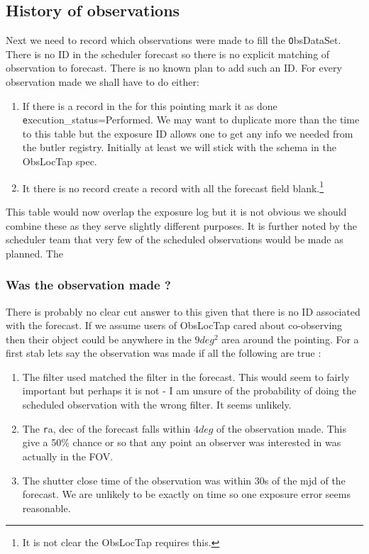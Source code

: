 \subsection{History of observations}
Next we need to record which observations were made to fill the {\texttt ObsDataSet}.
There is no ID in the scheduler forecast so there is no explicit matching of observation to forecast.
There is no known plan to add such an ID.
For every observation made we shall have to do either:
\begin{enumerate}
\item If there is a record in the \DB for this pointing mark it as done {\texttt execution\_status=Performed}.  We may want to duplicate more than the time to this table but the exposure ID allows one to get any info we needed from the butler registry.
Initially at least we will stick with the schema in the ObsLocTap spec.
\item It there is no record create a record with  all the forecast field blank.\footnote{It is not clear the ObsLocTap requires this.}
\end{enumerate}

This table would now overlap the exposure log but it is not obvious we should combine these as they serve slightly different purposes.
It is further noted by the scheduler team that very few of the scheduled observations would be made as planned. The

\subsubsection{Was the  observation made ?}\label{sec:made}
There is probably no clear cut answer to this given that there is no ID associated with the forecast.
If we assume users of ObsLocTap cared about co-observing then their object could be anywhere in the
$9 deg^2$ area around the pointing.
For a first stab lets say the observation was made if all the following are true :

\begin{enumerate}
\item The filter used matched the filter in the forecast.
This would seem to fairly important but perhaps it is not - I am unsure of the probability of
doing the scheduled observation with the wrong filter. It seems unlikely.
\item The {\texttt ra, dec} of the forecast falls within $4 deg$ of the observation made.
This give a 50\% chance or so that any point an observer was interested in was actually in the FOV.
\item The shutter close time of the observation was within 30s of the mjd of the forecast.
We are unlikely to be exactly on time so one exposure error seems reasonable.
\end{enumerate}

